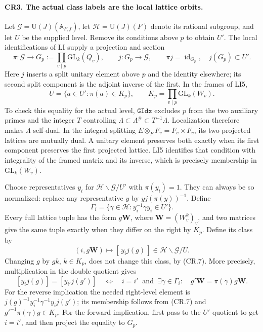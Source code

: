 \documentclass[11pt,a4paper]{article}
\numberwithin{equation}{section}
\theoremstyle{remark}\newtheorem{remark}[theorem]{Remark}
\begin{document}
\paragraph{CR3. The actual class labels are the local lattice orbits.}
Let $\mathcal G=\mathrm U(J)(\mathbb A_{F,f})$, let
$\mathcal H=\mathrm U(J)(F)$ denote its rational subgroup, and let
$U$ be the supplied level. Remove its conditions above $p$ to obtain
$U'$. The local identifications of LI supply a projection and section
\[
 \pi:\mathcal G\longrightarrow
       G_p:=\prod_{v\mid p}\mathrm{GL}_k(Q_v),\qquad
 j:G_p\longrightarrow\mathcal G,
 \qquad \pi j=\operatorname{id}_{G_p},\quad j(G_p)\subset U'.
\]
Here $j$ inserts a split unitary element above $p$ and the identity
elsewhere; its second split component is the adjoint inverse of the
first. In the frames of LI5,
\[
 U=\{a\in U':\pi(a)\in K_p\},
       \qquad K_p=\prod_{v\mid p}\mathrm{GL}_k(W_v).
                                                               \tag{CR.7}
\]
To check this equality for the actual level, $\texttt{GIdx}$ excludes
$p$ from the two auxiliary primes and the integer $T$ controlling
$\Lambda\subset\Lambda^{\#}\subset T^{-1}\Lambda$.
Localization therefore makes $\Lambda$ self-dual. In the integral
splitting $E\otimes_F F_v=F_v\times F_v$, its two projected lattices
are mutually dual. A unitary element preserves both exactly when its
first component preserves the first projected lattice. LI5 identifies
that condition with integrality of the framed matrix and its inverse,
which is precisely membership in $\mathrm{GL}_k(W_v)$.

Choose representatives $y_i$ for $\mathcal H\backslash\mathcal G/U'$
with $\pi(y_i)=1$. They can always be so normalized: replace any
representative $y$ by $yj(\pi(y))^{-1}$. Define
\[
 \Gamma_i=\{\gamma\in\mathcal H:y_i^{-1}\gamma y_i\in U'\}.
\]
Every full lattice tuple has the form $g\mathbf W$, where
$\mathbf W=(W_v^k)_v$, and two matrices give the same tuple exactly
when they differ on the right by $K_p$. Define its class by
\[
 (i,g\mathbf W)\longmapsto[\,y_i j(g)\,]
                        \in\mathcal H\backslash\mathcal G/U.
                                                               \tag{CR.8}
\]
Changing $g$ by $gk$, $k\in K_p$, does not change this class, by
(CR.7). More precisely, multiplication in the double quotient gives
\[
 [y_i j(g)]=[y_{i'}j(g')]
 \quad\Longleftrightarrow\quad
 i=i'\ \text{ and }\
 \exists\gamma\in\Gamma_i:\quad
       g'\mathbf W=\pi(\gamma)g\mathbf W.               \tag{CR.9}
\]
For the reverse implication the needed right-level element is
$j(g)^{-1}y_i^{-1}\gamma^{-1}y_i j(g')$; its membership follows
from (CR.7) and
$g'^{-1}\pi(\gamma)g\in K_p$.
For the forward implication, first pass to the $U'$-quotient to get
$i=i'$, and then project the equality to $G_p$.
\end{document}
